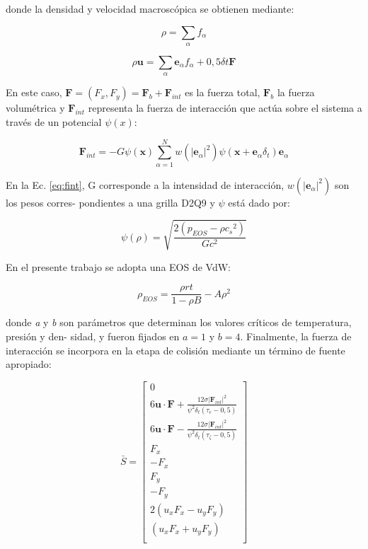 donde la densidad y velocidad macroscópica se obtienen mediante:

\begin{equation}
        \rho = \sum_{\alpha} f_{\alpha}
\end{equation}

\begin{equation}
    \rho \mathbf{u} = \sum_{\alpha} {\mathbf{e}}_{\alpha} f_{\alpha} + 0,5 {\delta}{t} \mathbf{F}
\end{equation}

En este caso, $ {\mathbf{F}} = (F_{x} , F_{y} ) = {\mathbf{F}}_{b} + {\mathbf{F}}_{int} $ es la fuerza total, ${\mathbf{F}}_{b}$ la fuerza volumétrica y ${\mathbf{F}}_{int}$
representa la fuerza de interacción que actúa sobre el sistema a través de un potencial $\psi(x)$:
    
\begin{equation}
    {\mathbf{F}}_{int} = - G \psi(\mathbf{x}) \sum_{\alpha=1}^{N} w({|{\mathbf{e}}_{\alpha}|}^{2}) \psi (\mathbf{x} + {\mathbf{e}}_{\alpha} \delta_{t}) {\mathbf{e}}_{\alpha} 
    \label{eq:fint}
\end{equation}

En la Ec. \ref{eq:fint}, G corresponde a la intensidad de interacción, $w({|{\mathbf{e}}_{\alpha}|}^{2})$ son los pesos corres-
pondientes a una grilla D2Q9 y $\psi$ está dado por:

\begin{equation} 
    \psi(\rho) = \sqrt{\frac{2 (p_{EOS} - \rho {c_{s}}^{2})}{G {c}^{2}}}
\end{equation}

En el presente trabajo se adopta una EOS de VdW:

\begin{equation}
    \rho_{EOS} = \frac{\rho r t}{1- \rho B} - A {\rho}^{2}
\end{equation}

donde \textit{a} y \textit{b} son parámetros que determinan los valores críticos de temperatura, presión y den-
sidad, y fueron fijados en $\textit{a} = 1$ y $\textit{b} = 4$. Finalmente, la fuerza de interacción se incorpora en la
etapa de colisión mediante un término de fuente apropiado:

\begin{equation}
    \bar{S} = 
    \left[ \begin{array}{c} 
        0\\
        6 \mathbf{u}\cdot \mathbf{F} + \frac{12 \sigma {|{\mathbf{F}_{int}|}}^{2} }{{\psi}^{2} \delta_{t} (\tau_{e} - 0,5)}\\
        6 \mathbf{u}\cdot \mathbf{F} - \frac{12 \sigma {|{\mathbf{F}_{int}|}}^{2} }{{\psi}^{2} \delta_{t} (\tau_{\zeta } - 0,5)}\\
        F_{x}\\
        -F_{x}\\
        F_{y}\\
        -F_{y}\\
        2(u_{x} F_{x} - u_{y} F_{y} )\\
        (u_{x} F_{x} + u_{y} F_{y} )\\              
    \end{array}
    \right]    
\end{equation}

